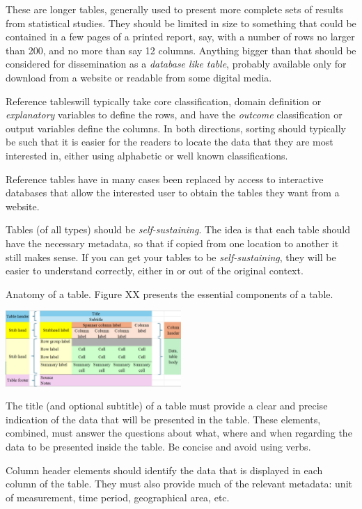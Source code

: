 \documentclass[
  12pt,
]{book}
\begin{document}
These are longer tables, generally used to present more complete sets of results from statistical studies. They should be limited in size to something that could be contained in a few pages of a printed report, say, with a number of rows no larger than 200, and no more than say 12 columns. Anything bigger than that should be considered for dissemination as a \emph{database like table}, probably available only for download from a website or readable from some digital media.

Reference tableswill typically take core classification, domain definition or \emph{explanatory} variables to define the rows, and have the \emph{outcome} classification or output variables define the columns. In both directions, sorting should typically be such that it is easier for the readers to locate the data that they are most interested in, either using alphabetic or well known classifications.

Reference tables have in many cases been replaced by access to interactive databases that allow the interested user to obtain the tables they want from a website.

Tables (of all types) should be \emph{self-sustaining}. The idea is that each table should have the necessary metadata, so that if copied from one location to another it still makes sense. If you can get your tables to be \emph{self-sustaining}, they will be easier to understand correctly, either in or out of the original context.

Anatomy of a table. Figure XX presents the essential components of a table.

\includegraphics[width=0.5\textwidth,height=\textheight]{pics/Table1.jpg}

The title (and optional subtitle) of a table must provide a clear and precise indication of the data that will be presented in the table. These elements, combined, must answer the questions about what, where and when regarding the data to be presented inside the table. Be concise and avoid using verbs.

Column header elements should identify the data that is displayed in each column of the table. They must also provide much of the relevant metadata: unit of measurement, time period, geographical area, etc.
\end{document}
